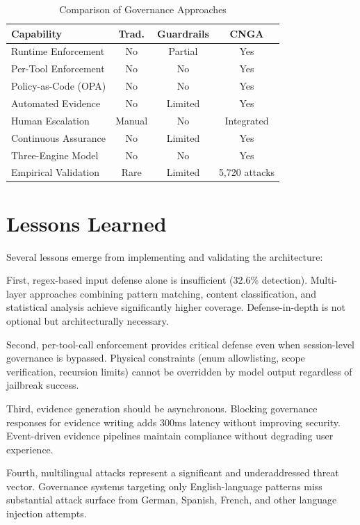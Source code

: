 \documentclass[conference]{IEEEtran}
\begin{document}
\begin{table}[htbp]
\caption{Comparison of Governance Approaches}
\centering
\begin{tabular}{|l|c|c|c|}
\hline
\textbf{Capability} & \textbf{Trad.} & \textbf{Guardrails} & \textbf{CNGA} \\
\hline
Runtime Enforcement & No & Partial & Yes \\
\hline
Per-Tool Enforcement & No & No & Yes \\
\hline
Policy-as-Code (OPA) & No & No & Yes \\
\hline
Automated Evidence & No & Limited & Yes \\
\hline
Human Escalation & Manual & No & Integrated \\
\hline
Continuous Assurance & No & Limited & Yes \\
\hline
Three-Engine Model & No & No & Yes \\
\hline
Empirical Validation & Rare & Limited & 5,720 attacks \\
\hline
\end{tabular}
\end{table}

\section{Lessons Learned}

Several lessons emerge from implementing and validating the architecture:

First, regex-based input defense alone is insufficient (32.6\% detection). Multi-layer approaches combining pattern matching, content classification, and statistical analysis achieve significantly higher coverage. Defense-in-depth is not optional but architecturally necessary.

Second, per-tool-call enforcement provides critical defense even when session-level governance is bypassed. Physical constraints (enum allowlisting, scope verification, recursion limits) cannot be overridden by model output regardless of jailbreak success.

Third, evidence generation should be asynchronous. Blocking governance responses for evidence writing adds 300ms latency without improving security. Event-driven evidence pipelines maintain compliance without degrading user experience.

Fourth, multilingual attacks represent a significant and underaddressed threat vector. Governance systems targeting only English-language patterns miss substantial attack surface from German, Spanish, French, and other language injection attempts.
\end{document}
